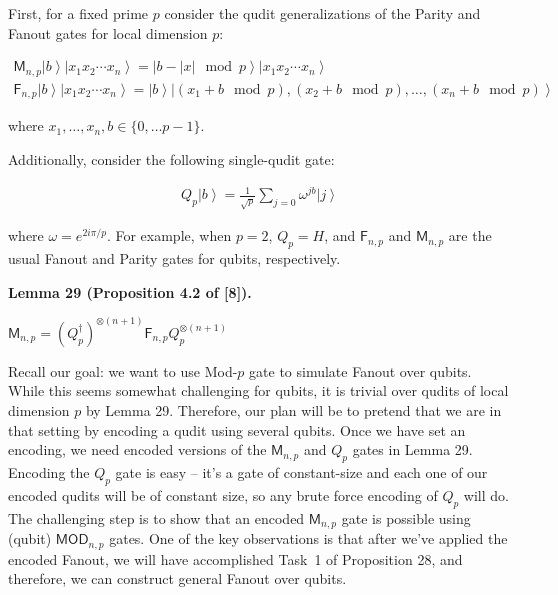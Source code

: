 \documentclass[10pt,a4paper]{article}
\begin{document}
First, for a fixed prime $p$ consider the qudit generalizations of the Parity and Fanout gates for local dimension $p$:\par


\[\begin{gathered}
\displaystyle\mathsf{M}_{n,p}\left|b\right\rangle\left|x_{1}x_{2}\cdots x_{n}\right\rangle \displaystyle=\left|b-|x|\mod{p}\right\rangle\left|x_{1}x_{2}\cdots x_{n}\right\rangle \\
\displaystyle\mathsf{F}_{n,p}\left|b\right\rangle\left|x_{1}x_{2}\cdots x_{n}\right\rangle \displaystyle=\left|b\right\rangle\left|(x_{1}+b\mod{p}),(x_{2}+b\mod{p}),\ldots,(x_{n}+b\mod{p})\right\rangle
\end{gathered}\]


where $x_{1},\ldots,x_{n},b\in\{0,\dots p-1\}$.\par




Additionally, consider the following single-qudit gate:\par


\[\begin{gathered}
\displaystyle Q_{p}\left|b\right\rangle=\frac{1}{\sqrt{p}}\sum_{j=0}\omega^{jb}\left|j\right\rangle
\end{gathered}\]


where $\omega=e^{2i\pi/p}$. For example, when $p=2$, $Q_{p}=H$, and $\mathsf{F}_{n,p}$ and $\mathsf{M}_{n,p}$ are the usual Fanout and Parity gates for qubits, respectively.\par





\par\medskip\noindent\textbf{
\textbf{Lemma 29}\textbf{ }(Proposition 4.2 of [8])\textbf{.}
}\par



$\mathsf{M}_{n,p}=(Q_{p}^{{\dagger}})^{\otimes(n+1)}\mathsf{F}_{n,p}Q_{p}^{\otimes(n+1)}$\emph{}\par






Recall our goal: we want to use Mod-$p$ gate to simulate Fanout over qubits. While this seems somewhat challenging for qubits, it is trivial over qudits of local dimension $p$ by Lemma 29. Therefore, our plan will be to pretend that we are in that setting by encoding a qudit using several qubits. Once we have set an encoding, we need encoded versions of the $\mathsf{M}_{n,p}$ and $Q_{p}$ gates in Lemma 29. Encoding the $Q_{p}$ gate is easy – it’s a gate of constant-size and each one of our encoded qudits will be of constant size, so any brute force encoding of $Q_{p}$ will do. The challenging step is to show that an encoded $\mathsf{M}_{n,p}$ gate is possible using (qubit) $\mathsf{MOD}_{n,p}$ gates. One of the key observations is that after we’ve applied the encoded Fanout, we will have accomplished Task 1 of Proposition 28, and therefore, we can construct general Fanout over qubits.\par
\end{document}
